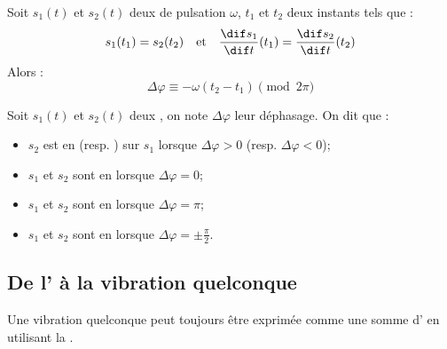 \begin{propriete}
Soit $s_1(t)$ et $s_2(t)$ deux  de pulsation $\omega$, $t_1$ et $t_2$ deux instants tels que :
\[s_1(t_1) = s_2(t_2) \quad \text{et} \quad \frac{\dif s_1}{\dif t}(t_1) = \frac{\dif s_2}{\dif t}(t_2)\]
Alors :
\[\Delta\varphi \equiv -\omega(t_2 - t_1) \pmod{2\pi}\]
\end{propriete}

\begin{vocabulaire}
Soit $s_1(t)$ et $s_2(t)$ deux , on note $\Delta\varphi$ leur déphasage. On dit que :

\begin{itemize}
\item $s_2$ est en  (resp. ) sur $s_1$ lorsque $\Delta\varphi > 0$ (resp. $\Delta\varphi < 0$);

\item $s_1$ et $s_2$ sont en  lorsque $\Delta\varphi = 0$;

\item $s_1$ et $s_2$ sont en  lorsque $\Delta\varphi = \pi$;

\item $s_1$ et $s_2$ sont en  lorsque $\Delta\varphi = \pm\frac{\pi}{2}$.
\end{itemize}
\end{vocabulaire}



\subsection{De l' à la vibration quelconque}

\begin{propriete}[admis]
Une vibration quelconque peut toujours être exprimée comme une somme d' en utilisant la .
\end{propriete}